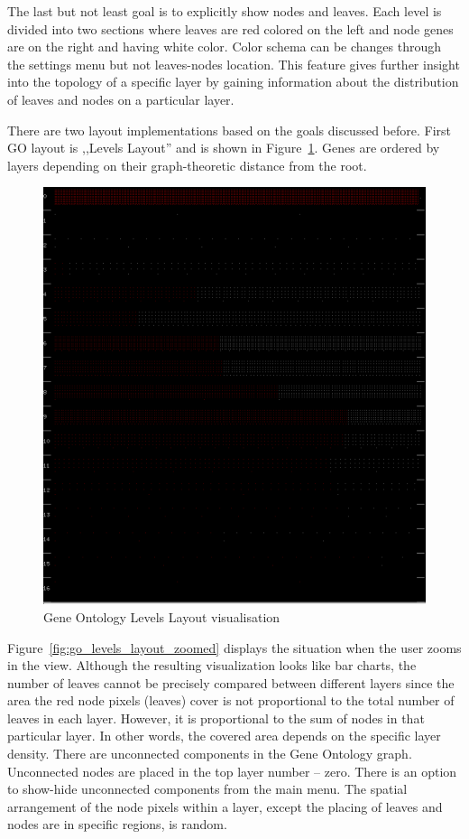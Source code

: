 The last but not least goal is to explicitly show nodes and leaves. Each level is divided into two sections where leaves are red colored on the left and node genes are on the right and having white color.
Color schema can be changes through the settings menu but not leaves-nodes location.
This feature gives further insight into the topology of a specific layer by gaining information about the distribution of leaves and nodes on a particular layer.

There are two layout implementations based on the goals discussed before. First GO layout is ,,Levels Layout'' and is shown in Figure~\ref{fig:go_levels_layout}.
Genes are ordered by layers depending on their graph-theoretic distance from the root.

\begin{figure}[h!]
\centering
\includegraphics[scale=0.3]{pictures/go_levels_layout.png}
\caption{Gene Ontology Levels Layout visualisation}
\label{fig:go_levels_layout}
\end{figure}

Figure~\ref{fig:go_levels_layout_zoomed} displays the situation when the user zooms in the view.
Although the resulting visualization looks like bar charts, the number of leaves cannot be precisely compared between different layers since
the area the red node pixels (leaves) cover is not proportional to the total number of leaves in each layer.
However, it is proportional to the sum of nodes in that particular layer. In other words, the covered area depends on the specific layer density.
There are unconnected components in the Gene Ontology graph.
Unconnected nodes are placed in the top layer number -- zero. There is an option to show-hide unconnected components from the main menu.
The spatial arrangement of the node pixels within a layer, except the placing of leaves and nodes are in specific regions, is random.

